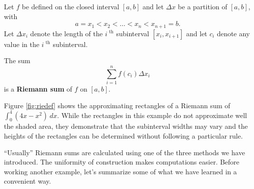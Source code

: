 {Let $f$ be defined on the closed interval $[a,b]$ and let $\Delta x$ be a partition of $[a,b]$, with 
	$$a=x_1 < x_2 < \ldots < x_n < x_{n+1}=b.$$
Let $\Delta x_i$ denote the length of the $i^\text{ th}$ subinterval $[x_i,x_{i+1}]$ and let $c_i$ denote any value in the $i^\text{ th}$ subinterval.

The sum $$\sum_{i=1}^n f(c_i)\Delta x_i$$  is a \textbf{Riemann sum} of $f$ on $[a,b]$.}

Figure \ref{fig:riedef} shows the approximating rectangles of a Riemann sum of $\int_0^4(4x-x^2)\ dx$. While the rectangles in this example do not approximate well the shaded area, they demonstrate that the subinterval widths may vary and the heights of the rectangles can be determined without following a particular rule.

``Usually'' Riemann sums are calculated using one of the three methods we have introduced. The uniformity of construction  makes computations easier. Before working another example, let's summarize some of what we have learned in a convenient way.

